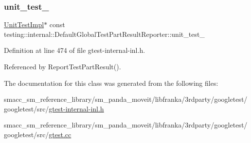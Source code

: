 \subsubsection{\texorpdfstring{unit\+\_\+test\+\_\+}{unit\_test\_}}
{\footnotesize\ttfamily \hyperlink{classtesting_1_1internal_1_1UnitTestImpl}{Unit\+Test\+Impl}$\ast$ const testing\+::internal\+::\+Default\+Global\+Test\+Part\+Result\+Reporter\+::unit\+\_\+test\+\_\+\hspace{0.3cm}{\ttfamily [private]}}



Definition at line 474 of file gtest-\/internal-\/inl.\+h.



Referenced by Report\+Test\+Part\+Result().



The documentation for this class was generated from the following files\+:\begin{DoxyCompactItemize}
\item 
smacc\+\_\+sm\+\_\+reference\+\_\+library/sm\+\_\+panda\+\_\+moveit/libfranka/3rdparty/googletest/googletest/src/\hyperlink{gtest-internal-inl_8h}{gtest-\/internal-\/inl.\+h}\item 
smacc\+\_\+sm\+\_\+reference\+\_\+library/sm\+\_\+panda\+\_\+moveit/libfranka/3rdparty/googletest/googletest/src/\hyperlink{gtest_8cc}{gtest.\+cc}\end{DoxyCompactItemize}
